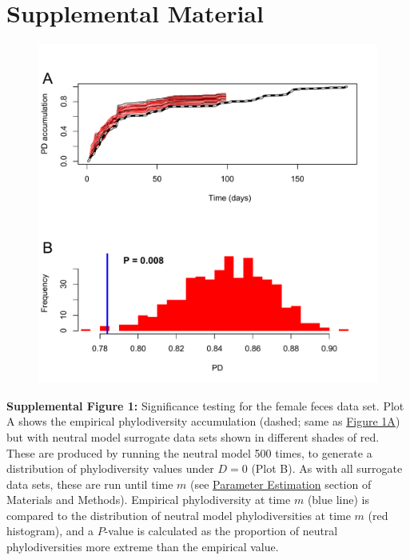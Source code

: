 \documentclass{article}
\begin{document}
\section{Supplemental Material}
{\parindent0pt %
\begin{figure}[ht]
	\centering
	\includegraphics[scale=0.80]{figs/Fig_S1.pdf}
\end{figure}
\textbf{Supplemental Figure 1:}\label{sec:figureS1} Significance testing for the female feces data set. Plot A shows the empirical phylodiversity accumulation (dashed; same as \hyperref[sec:figure1]{Figure 1A}) but with neutral model surrogate data sets shown in different shades of red. These are produced by running the neutral model 500 times, to generate a distribution of phylodiversity values under \(D = 0\) (Plot B). As with all surrogate data sets, these are run until time \(m\) (see \hyperref[sec:parameterEstimation]{Parameter Estimation} section of Materials and Methods). Empirical phylodiversity at time \(m\) (blue line) is compared to the distribution of neutral model phylodiversities at time \(m\) (red histogram), and a \(P\)-value is calculated as the proportion of neutral phylodiversities more extreme than the empirical value. 
\newpage

}
\end{document}
